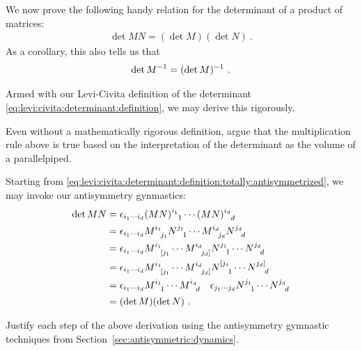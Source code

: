 \documentclass[12pt, oneside]{report}    %
\newenvironment{wide}{\begin{adjustwidth}{0cm}{-6.25cm}}{\end{adjustwidth}}
\begin{document}
We now prove the following handy relation for the determinant of a product of matrices:
\begin{align}
    \det MN = (\det M)(\det N) \ .
    \label{eq:det:product:rule}
\end{align}
As a corollary, this also tells us that
\begin{align}
    \det M^{-1} = (\det M)^{-1} \ .
\end{align}

Armed with our Levi-Civita definition of the determinant \eqref{eq:levi:civita:determinant:definition}, we may derive this rigorously.
\begin{exercise}
Even without a mathematically rigorous definition, argue that the multiplication rule above is true based on the interpretation of the determinant as the volume of a parallelpiped. 
\end{exercise}
Starting from \eqref{eq:levi:civita:determinant:definition:totally:antisymmetrized}, we may invoke our antisymmetry gynmastics:
\begin{align}
    \det MN &= 
    \epsilon_{i_1 \cdots i_d}
    (MN)\aij{i_1}{1}\cdots (MN)\aij{i_d}{d} 
    \\
    &= 
    \epsilon_{i_1 \cdots i_d}
    M\aij{i_1}{j_1}N\aij{j_1}{1}
    \cdots 
    M\aij{i_d}{j_d}N\aij{j_d}{d}
    \\
    &= 
    \epsilon_{i_1 \cdots i_d}
    M\aij{i_1}{[j_1}
    \cdots 
    M\aij{i_d}{j_d]}
    N\aij{j_1}{1}
    \cdots
    N\aij{j_d}{d}
    \\
    &= 
    \epsilon_{i_1 \cdots i_d}
    M\aij{i_1}{[j_1}
    \cdots 
    M\aij{i_d}{j_d]}
    N\aij{[j_1}{1}
    \cdots
    N\aij{j_d]}{d}
    \\
    &= 
    \epsilon_{i_1 \cdots i_d}
    M\aij{i_1}{1}
    \cdots 
    M\aij{i_d}{d}\quad
    \epsilon_{j_1 \cdots j_d}
    N\aij{j_1}{1}
    \cdots
    N\aij{j_d}{d}
    \\
    &= 
    (\det M)
    (\det N)
    \ .
\end{align}
\begin{exercise}
Justify each step of the above derivation using the antisymmetry gymnastic techniques from Section~\ref{sec:antisymmetric:dynamics}.
\end{exercise}
\end{document}
